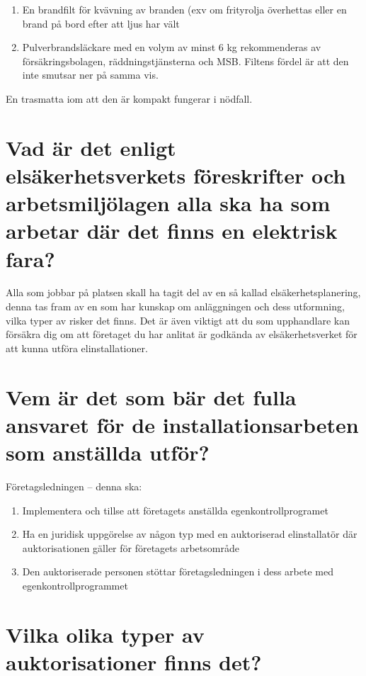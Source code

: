 \documentclass[a4paper,swedish]{article}
\begin{document}
\begin{enumerate}
\item En brandfilt för kvävning av branden (exv om frityrolja överhettas eller en brand på bord
  efter att ljus har vält
\item Pulverbrandsläckare med en volym av minst 6 kg rekommenderas av försäkringsbolagen, räddningstjänsterna och MSB. Filtens fördel är att den inte smutsar ner på samma vis.
\end{enumerate}

En trasmatta iom att den är kompakt fungerar i nödfall.

\section{Vad är det enligt elsäkerhetsverkets föreskrifter och arbetsmiljölagen alla ska ha som arbetar där det finns en elektrisk fara?}
\label{sec:q_47}

Alla som jobbar på platsen skall ha tagit del av en så kallad elsäkerhetsplanering, denna tas fram av en som har kunskap om anläggningen och dess utformning, vilka typer av risker det finns. Det är även viktigt att du som upphandlare kan försäkra dig om att företaget du har anlitat är godkända av elsäkerhetsverket för att kunna utföra elinstallationer.

\section{Vem är det som bär det fulla ansvaret för de installationsarbeten som anställda utför?}\label{sec:ansvar_elarbeten}

Företagsledningen -- denna ska:
\begin{enumerate}
\item Implementera och tillse att företagets anställda egenkontrollprogramet
\item Ha en juridisk uppgörelse av någon typ med en auktoriserad elinstallatör där auktorisationen
  gäller för företagets arbetsområde
\item Den auktoriserade personen stöttar företagsledningen i dess arbete med egenkontrollprogrammet
\end{enumerate}

\section{Vilka olika typer av auktorisationer finns det?}
\label{sec:q_49}
\end{document}

